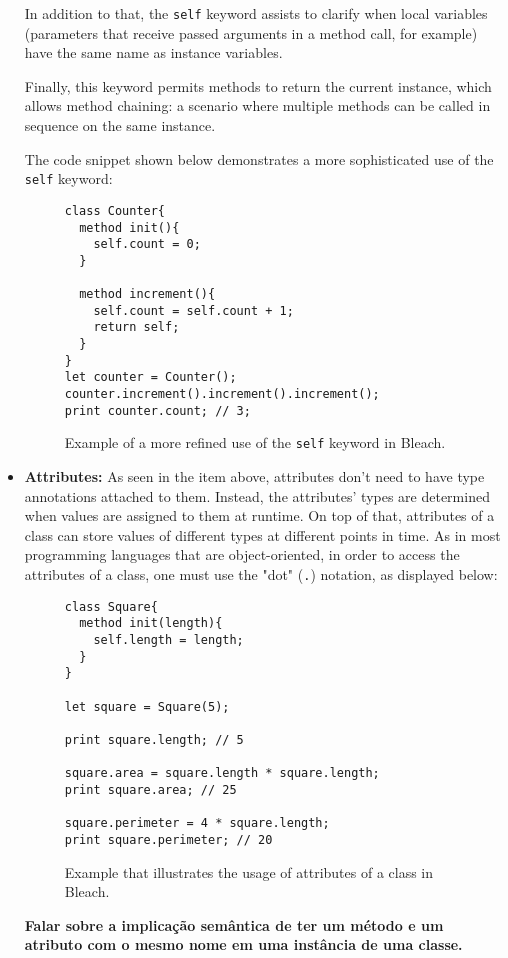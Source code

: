 \begin{itemize}
    In addition to that, the \texttt{self} keyword assists to clarify when local variables (parameters that receive passed arguments in a method call, for example) have the same name as instance variables.

    Finally, this keyword permits methods to return the current instance, which allows method chaining: a scenario where multiple methods can be called in sequence on the same instance.

    The code snippet shown below demonstrates a more sophisticated use of the \texttt{self} keyword:
\begin{figure}[H]
    \centering
    \begin{lstlisting}
class Counter{
  method init(){
    self.count = 0;
  }

  method increment(){
    self.count = self.count + 1;
    return self;
  }
}
let counter = Counter();
counter.increment().increment().increment();
print counter.count; // 3;
    \end{lstlisting}
    \caption{Example of a more refined use of the \texttt{self} keyword in Bleach.}
\end{figure}
    
    \item \textbf{Attributes:} As seen in the item above, attributes don't need to have type annotations attached to them. Instead, the attributes' types are determined when values are assigned to them at runtime. On top of that, attributes of a class can store values of different types at different points in time. As in most programming languages that are object-oriented, in order to access the attributes of a class, one must use the "dot" (\texttt{.}) notation, as displayed below:
\begin{figure}[H]
    \centering
    \begin{lstlisting}
class Square{
  method init(length){
    self.length = length;
  }
}

let square = Square(5);

print square.length; // 5

square.area = square.length * square.length;
print square.area; // 25

square.perimeter = 4 * square.length;
print square.perimeter; // 20
    \end{lstlisting}
    \caption{Example that illustrates the usage of attributes of a class in Bleach.}
\end{figure}

    \textbf{Falar sobre a implicação semântica de ter um método e um atributo com o mesmo nome em uma instância de uma classe.}


\end{itemize}
